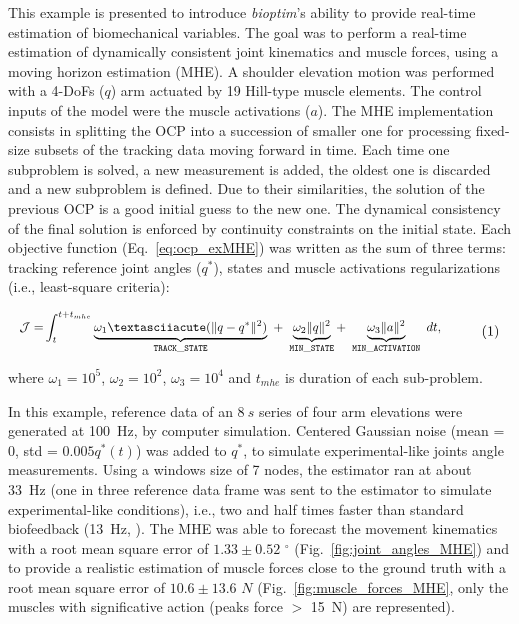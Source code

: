 This example is presented to introduce \textit{bioptim}'s ability to provide real-time estimation of biomechanical variables.
The goal was to perform a real-time estimation of dynamically consistent joint kinematics and muscle forces, using a moving horizon estimation (MHE). 
A shoulder elevation motion was performed with a 4-DoFs ($q$) arm actuated by 19 Hill-type muscle elements.
The control inputs of the model were the muscle activations ($a$).
The MHE implementation consists in splitting the OCP into a succession of smaller one for processing fixed-size subsets of the tracking data moving forward in time. 
Each time one subproblem is solved, a new measurement is added, the oldest one is discarded and a new subproblem is defined. 
Due to their similarities, the solution of the previous OCP is a good initial guess to the new one. 
The dynamical consistency of the final solution is enforced by continuity constraints on the initial state. 
Each objective function (Eq.~\ref{eq:ocp_exMHE}) was written as the sum of three terms: tracking reference joint angles ($q^*$), states and muscle activations regularizations (i.e., least-square criteria): 

\[ 
\resizebox{0.9\columnwidth}{!}{$ 
\begin{aligned}
\mathcal{J} = &\int_t^{t+t_{mhe}}\underbrace{\omega_1´(\|q - q^*\|^{2})}_{\mathtt{TRACK\_STATE}}~ 
+ ~ \underbrace{\omega_2\|q\|^2}_{\mathtt{MIN\_STATE}} 
+ ~ \underbrace{\omega_3\|a\|^2}_{\mathtt{MIN\_ACTIVATION}}~dt, 
\end{aligned}  
$}  
\addtag  
\label{eq:ocp_exMHE}  
\]  

\noindent where $\omega_1 =10^5$, $\omega_2 = 10^2$, $\omega_3 = 10^4$ and $t_{mhe}$ is duration of each sub-problem. 

In this example, reference data of an $8~s$ series of four arm elevations were generated at 100~Hz, by computer simulation.
Centered Gaussian noise (mean = 0, std = $0.005q^*(t)$) was added to $q^*$, to simulate experimental-like joints angle measurements.
Using a windows size of 7 nodes, the estimator ran at about 33~Hz (one in three reference data frame was sent to the estimator to simulate experimental-like conditions), i.e., two and half times faster than standard biofeedback (13~Hz, \cite{kannape2013biofeedback}).
The MHE was able to forecast the movement kinematics with a root mean square error of $1.33\pm0.52\text{~}^{\circ}$ (Fig.~\ref{fig:joint_angles_MHE}) and to provide a realistic estimation of muscle forces close to the ground truth with a root mean square error of $10.6\pm13.6\text{~}N$ (Fig.~\ref{fig:muscle_forces_MHE}, only the muscles with significative action (peaks force $>$ 15~N) are represented). 

